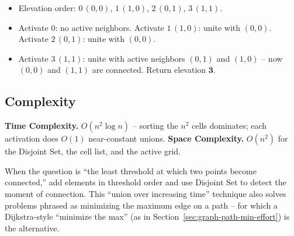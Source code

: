 \begin{itemize}
  \item Elevation order: $0\,(0,0)$, $1\,(1,0)$, $2\,(0,1)$,
        $3\,(1,1)$.
  \item Activate $0$: no active neighbors. Activate $1\,(1,0)$: unite
        with $(0,0)$. Activate $2\,(0,1)$: unite with $(0,0)$.
  \item Activate $3\,(1,1)$: unite with active neighbors $(0,1)$ and
        $(1,0)$ -- now $(0,0)$ and $(1,1)$ are connected. Return
        elevation $\mathbf{3}$.
\end{itemize}

\subsection*{Complexity}

\begin{complexitybox}
\textbf{Time Complexity.} $O(n^2\log n)$ -- sorting the $n^2$ cells
dominates; each activation does $O(1)$ near-constant unions.
\textbf{Space Complexity.} $O(n^2)$ for the Disjoint Set, the cell
list, and the active grid.
\end{complexitybox}

\begin{takeawaybox}
When the question is ``the least threshold at which two points become
connected,'' add elements in threshold order and use Disjoint Set to
detect the moment of connection. This ``union over increasing time''
technique also solves problems phrased as minimizing the maximum edge on
a path -- for which a Dijkstra-style ``minimize the max'' (as in
Section~\ref{sec:graph-path-min-effort}) is the alternative.
\end{takeawaybox}
